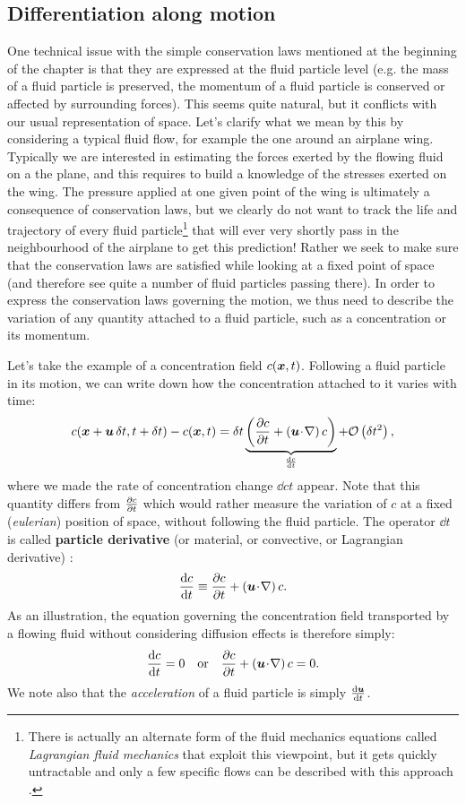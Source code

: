 \subsection{Differentiation along motion}
One technical issue with the simple conservation laws mentioned at the beginning of the chapter is that they are expressed at the fluid particle level (e.g. the mass of a fluid particle is preserved, the momentum of a fluid particle is conserved or affected by surrounding forces). This seems quite natural, but it conflicts with our usual representation of space. Let's clarify what we mean by this by considering a typical fluid flow, for example the one around an airplane wing. Typically we are interested in estimating the forces exerted by the flowing fluid on a the plane, and this requires to build a knowledge of the stresses exerted on the wing. The pressure applied at one given point of the wing is ultimately a consequence of conservation laws, but we clearly do not want to track the life and trajectory of every fluid particle\footnote{There is actually an alternate form of the fluid mechanics equations called \textit{Lagrangian fluid mechanics} that exploit this viewpoint, but it gets quickly untractable and only a few specific flows can be described with this approach \citep{Bennett2006}.} that will ever very shortly pass in the neighbourhood of the airplane to get this prediction! Rather we seek to make sure that the conservation laws are satisfied while looking at a fixed point of space (and therefore see quite a number of fluid particles passing there). In order to express the conservation laws governing the motion, we thus need to describe the variation of any quantity attached to a fluid particle, such as a concentration or its momentum.

Let's take the example of a concentration field $c(\bx,t)$. Following a fluid particle in its motion, we can write down how the concentration attached to it varies with time:
\begin{equation}
c(\bx+\bu\, \delt,t+\delt) - c(\bx,t) = \delt\underbrace{\lp\pd{c}{t} + \lp \bu \!\cdot\! \nabla \rp c\rp}_{\dd{c}{t}} + \mathcal O\lp\delt^2\rp,
\end{equation}
where we made the rate of concentration change $\dd{c}{t}$ appear. Note that this quantity differs from $\frac{\partial c}{\partial t}$ which would rather measure the variation of  $c$ at a fixed (\textit{eulerian}) position of space, without following the fluid particle. The operator $\dd{}{t}$ is called \textbf{particle derivative} (or material, or convective, or Lagrangian derivative) :
\begin{equation}
\dd{c}{t} \equiv \pd{c}{t} + \lp \bu \!\cdot\! \nabla \rp c.
\end{equation}
As an illustration, the equation governing the concentration field transported by a flowing fluid without considering diffusion effects is therefore simply:
\begin{equation}
\dd{c}{t} = 0 \quad \text{or}\quad\pd{c}{t} + \lp \bu \!\cdot\! \nabla \rp c = 0.
\end{equation}
We note also that the \textit{acceleration} of a fluid particle is simply $\dd{\bu}{t}$.

